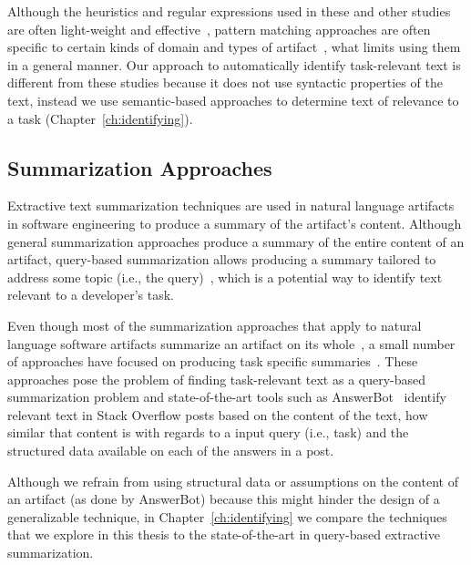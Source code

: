Although the heuristics and regular expressions used in these and other studies~\cite{nadi2020, Maalej2013}
are often light-weight and effective~\cite{Bavota2016}, 
pattern matching approaches are often specific to certain kinds of domain and 
types of artifact~\cite{fucci2019}, what limits
using them in a general manner. 
Our approach to automatically identify task-relevant text 
is different from these studies because it does not use syntactic properties of the text, 
instead we use semantic-based approaches to determine text of relevance to a task (Chapter~\ref{ch:identifying}).





\subsection{Summarization Approaches}
\label{cp2:summarization}



Extractive text summarization techniques are used in natural language artifacts in software engineering to
produce a summary of the artifact's content. 
Although general summarization approaches produce a summary of the entire content of an artifact, 
query-based summarization allows 
producing a summary tailored to address some topic (i.e., the query)~\cite{Goldsteinet1999}, which is a potential way to identify 
text relevant to a developer's task. 


Even though most of the summarization approaches that apply to natural language software artifacts 
summarize an artifact on its whole~\cite{Rastkar2010, Murray2008, Lotufo2012, Ponzanelli2015},
a small number of approaches have focused on
producing task specific summaries~\cite{Xu2017, silva2019}.
These approaches pose the problem of finding task-relevant text 
as a query-based summarization problem and
state-of-the-art tools such as AnswerBot~\cite{Xu2017}
identify relevant text in Stack Overflow posts 
based on 
the content of the text, how similar that content is with regards to a input query (i.e., task)
and the structured data available on each of the answers in a post.



Although we refrain from using structural data 
or assumptions on the content of an artifact (as done by AnswerBot)
because this might hinder the design of a
generalizable technique, in 
Chapter~\ref{ch:identifying} 
we compare the techniques that we explore in this thesis
 to  the state-of-the-art
 in query-based extractive summarization. 



